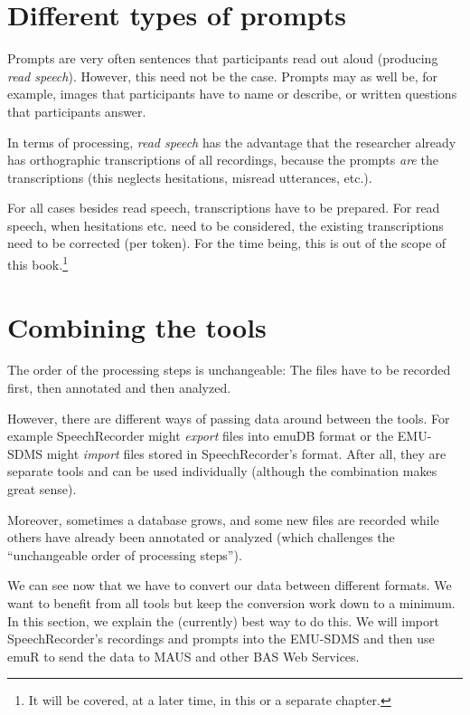 \documentclass[]{book}
\let\rmarkdownfootnote\footnote%
\def\footnote{\protect\rmarkdownfootnote}
\theoremstyle{definition}
\theoremstyle{definition}
\theoremstyle{definition}
\theoremstyle{remark}
\begin{document}
\section{Different types of prompts}\label{different-types-of-prompts}

Prompts are very often sentences that participants read out aloud
(producing \emph{read speech}). However, this need not be the case.
Prompts may as well be, for example, images that participants have to
name or describe, or written questions that participants answer.

In terms of processing, \emph{read speech} has the advantage that the
researcher already has orthographic transcriptions of all recordings,
because the prompts \emph{are} the transcriptions (this neglects
hesitations, misread utterances, etc.).

For all cases besides read speech, transcriptions have to be prepared.
For read speech, when hesitations etc. need to be considered, the
existing transcriptions need to be corrected (per token). For the time
being, this is out of the scope of this book.\footnote{It will be
  covered, at a later time, in this or a separate chapter.}

\section{Combining the tools}\label{combining-the-tools}

The order of the processing steps is unchangeable: The files have to be
recorded first, then annotated and then analyzed.

However, there are different ways of passing data around between the
tools. For example SpeechRecorder might \emph{export} files into emuDB
format or the EMU-SDMS might \emph{import} files stored in
SpeechRecorder's format. After all, they are separate tools and can be
used individually (although the combination makes great sense).

Moreover, sometimes a database grows, and some new files are recorded
while others have already been annotated or analyzed (which challenges
the ``unchangeable order of processing steps'').

We can see now that we have to convert our data between different
formats. We want to benefit from all tools but keep the conversion work
down to a minimum. In this section, we explain the (currently) best way
to do this. We will import SpeechRecorder's recordings and prompts into
the EMU-SDMS and then use emuR to send the data to MAUS and other BAS
Web Services.
\end{document}
